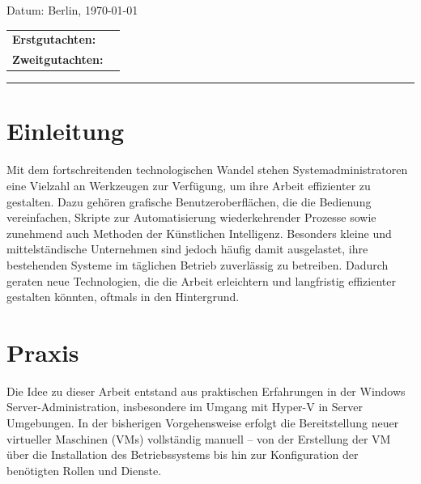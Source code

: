 \documentclass[a4paper,12pt]{article}
\begin{document}
\begin{titlepage}
    \begin{center}
        {\Large Datum: Berlin, \today}
    \end{center}


\begin{center}
    \begin{tabular}{ll}
        {\bfseries\large Erstgutachten:} &  \\
        {\bfseries\large Zweitgutachten:} &  \\
    \end{tabular}
\end{center}


    \textcolor{HTW}{\rule{\linewidth}{0.4mm}}

\end{titlepage}


\newpage

\tableofcontents

\newpage

\section{Einleitung}

Mit dem fortschreitenden technologischen Wandel stehen Systemadministratoren eine Vielzahl an Werkzeugen zur Verfügung, um ihre Arbeit effizienter zu gestalten. Dazu gehören grafische Benutzeroberflächen, die die Bedienung vereinfachen, Skripte zur Automatisierung wiederkehrender Prozesse sowie zunehmend auch Methoden der Künstlichen Intelligenz.
Besonders kleine und mittelständische Unternehmen sind jedoch häufig damit ausgelastet, ihre bestehenden Systeme im täglichen Betrieb zuverlässig zu betreiben. Dadurch geraten neue Technologien, die die Arbeit erleichtern und langfristig effizienter gestalten könnten, oftmals in den Hintergrund.\\

\section{Praxis}

Die Idee zu dieser Arbeit entstand aus praktischen Erfahrungen in der Windows Server-Administration, insbesondere im Umgang mit Hyper-V in Server Umgebungen. In der bisherigen Vorgehensweise erfolgt die Bereitstellung neuer virtueller Maschinen (VMs) vollständig manuell – von der Erstellung der VM über die Installation des Betriebssystems bis hin zur Konfiguration der benötigten Rollen und Dienste.\\
\end{document}
